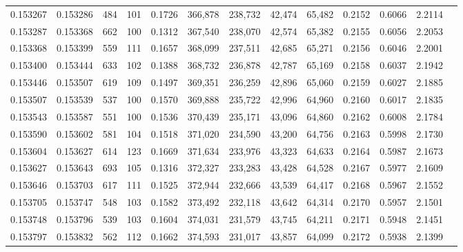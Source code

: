 \begin{tabular}{rrrrrrrrrrrrr}
0.153267 & 0.153286 &   484 & 101 &                                     0.1726 & 366,878 & 238,732 &  42,474 &  65,482 & 0.2152 & 0.6066 & 2.2114 \\
0.153287 & 0.153368 &   662 & 100 &                                     0.1312 & 367,540 & 238,070 &  42,574 &  65,382 & 0.2155 & 0.6056 & 2.2053 \\
0.153368 & 0.153399 &   559 & 111 &                                     0.1657 & 368,099 & 237,511 &  42,685 &  65,271 & 0.2156 & 0.6046 & 2.2001 \\
0.153400 & 0.153444 &   633 & 102 &                                     0.1388 & 368,732 & 236,878 &  42,787 &  65,169 & 0.2158 & 0.6037 & 2.1942 \\
0.153446 & 0.153507 &   619 & 109 &                                     0.1497 & 369,351 & 236,259 &  42,896 &  65,060 & 0.2159 & 0.6027 & 2.1885 \\
0.153507 & 0.153539 &   537 & 100 &                                     0.1570 & 369,888 & 235,722 &  42,996 &  64,960 & 0.2160 & 0.6017 & 2.1835 \\
0.153543 & 0.153587 &   551 & 100 &                                     0.1536 & 370,439 & 235,171 &  43,096 &  64,860 & 0.2162 & 0.6008 & 2.1784 \\
0.153590 & 0.153602 &   581 & 104 &                                     0.1518 & 371,020 & 234,590 &  43,200 &  64,756 & 0.2163 & 0.5998 & 2.1730 \\
0.153604 & 0.153627 &   614 & 123 &                                     0.1669 & 371,634 & 233,976 &  43,323 &  64,633 & 0.2164 & 0.5987 & 2.1673 \\
0.153627 & 0.153643 &   693 & 105 &                                     0.1316 & 372,327 & 233,283 &  43,428 &  64,528 & 0.2167 & 0.5977 & 2.1609 \\
0.153646 & 0.153703 &   617 & 111 &                                     0.1525 & 372,944 & 232,666 &  43,539 &  64,417 & 0.2168 & 0.5967 & 2.1552 \\
0.153705 & 0.153747 &   548 & 103 &                                     0.1582 & 373,492 & 232,118 &  43,642 &  64,314 & 0.2170 & 0.5957 & 2.1501 \\
0.153748 & 0.153796 &   539 & 103 &                                     0.1604 & 374,031 & 231,579 &  43,745 &  64,211 & 0.2171 & 0.5948 & 2.1451 \\
0.153797 & 0.153832 &   562 & 112 &                                     0.1662 & 374,593 & 231,017 &  43,857 &  64,099 & 0.2172 & 0.5938 & 2.1399 \\

\end{tabular}
